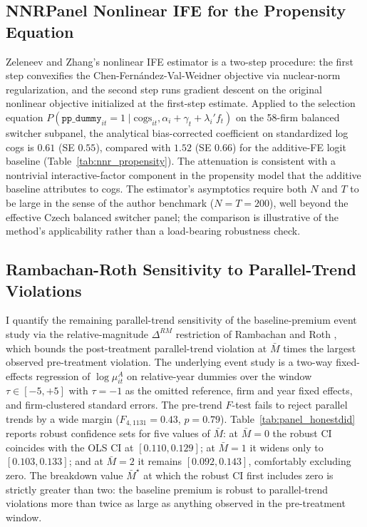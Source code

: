 \documentclass[11pt]{article}
\begin{document}
\subsection{NNRPanel Nonlinear IFE for the Propensity Equation}\label{app:nnr_propensity}

Zeleneev and Zhang's \cite{ZeleneevZhang2026} nonlinear IFE estimator is a two-step procedure: the first step convexifies the Chen-Fern\'{a}ndez-Val-Weidner \cite{ChenFernandezValWeidner2021} objective via nuclear-norm regularization, and the second step runs gradient descent on the original nonlinear objective initialized at the first-step estimate. Applied to the selection equation $P(\texttt{pp\_dummy}_{it} = 1 \mid \text{cogs}_{it}, \alpha_i + \gamma_t + \lambda_i' f_t)$ on the 58-firm balanced switcher subpanel, the analytical bias-corrected coefficient on standardized log cogs is $0.61$ (SE $0.55$), compared with $1.52$ (SE $0.66$) for the additive-FE logit baseline (Table~\ref{tab:nnr_propensity}). The attenuation is consistent with a nontrivial interactive-factor component in the propensity model that the additive baseline attributes to cogs. The estimator's asymptotics require both $N$ and $T$ to be large in the sense of the author benchmark ($N = T = 200$), well beyond the effective Czech balanced switcher panel; the comparison is illustrative of the method's applicability rather than a load-bearing robustness check.



\subsection{Rambachan-Roth Sensitivity to Parallel-Trend Violations}\label{app:honestdid}

I quantify the remaining parallel-trend sensitivity of the baseline-premium event study via the relative-magnitude $\Delta^{RM}$ restriction of Rambachan and Roth \cite{RambachanRoth2023}, which bounds the post-treatment parallel-trend violation at $\bar{M}$ times the largest observed pre-treatment violation. The underlying event study is a two-way fixed-effects regression of $\log \mu^A_{it}$ on relative-year dummies over the window $\tau \in [-5, +5]$ with $\tau = -1$ as the omitted reference, firm and year fixed effects, and firm-clustered standard errors. The pre-trend $F$-test fails to reject parallel trends by a wide margin ($F_{4, 1131} = 0.43$, $p = 0.79$). Table~\ref{tab:panel_honestdid} reports robust confidence sets for five values of $\bar{M}$: at $\bar{M} = 0$ the robust CI coincides with the OLS CI at $[0.110, 0.129]$; at $\bar{M} = 1$ it widens only to $[0.103, 0.133]$; and at $\bar{M} = 2$ it remains $[0.092, 0.143]$, comfortably excluding zero. The breakdown value $\bar{M}^\star$ at which the robust CI first includes zero is strictly greater than two: the baseline premium is robust to parallel-trend violations more than twice as large as anything observed in the pre-treatment window.
\end{document}
